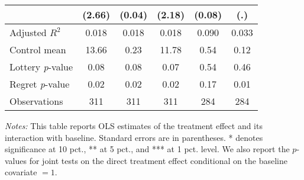 \begin{table}[ht]
{\begin{threeparttable}
\begin{tabular}{l*{5}{c}}
                &   (2.66)         &   (0.04)         &   (2.18)         &   (0.08)         &      (.)         \\
\midrule
Adjusted \(R^{2}\)&    0.018         &    0.018         &    0.018         &    0.090         &    0.033         \\
Control mean    &    13.66         &     0.23         &    11.78         &     0.54         &     0.12         \\
Lottery \emph{p}-value&     0.08         &     0.08         &     0.07         &     0.54         &     0.46         \\
Regret \emph{p}-value&     0.02         &     0.02         &     0.02         &     0.17         &     0.01         \\
Observations    &      311         &      311         &      311         &      284         &      284         \\
\bottomrule \end{tabular} \begin{tablenotes}[flushleft] \footnotesize \item \emph{Notes:} This table reports OLS estimates of the treatment effect and its interaction with baseline. Standard errors are in parentheses. * denotes significance at 10 pct., ** at 5 pct., and *** at 1 pct. level. We also report the \(p\)-values for joint tests on the direct treatment effect conditional on the baseline covariate $= 1$. \end{tablenotes} \end{threeparttable} } \end{table}

